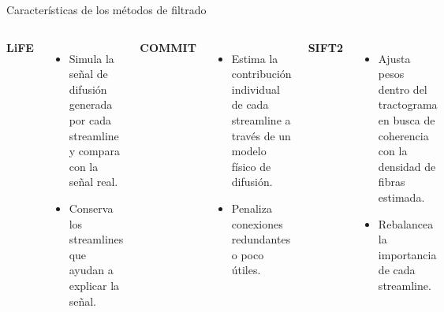 \documentclass[12pt, aspectratio=43]{beamer}
\begin{document}
\begin{frame}{Características de los métodos de filtrado}
\begin{center}
\begin{columns}[T]


\textbf{LiFE}

\vspace{0.2cm}

\begin{itemize}
    \item Simula la señal de difusión generada por cada streamline y compara con la señal real.
    \item Conserva los streamlines que ayudan a explicar la señal.
\end{itemize}


\textbf{COMMIT}

\vspace{0.2cm}

\begin{itemize}
    \item Estima la contribución individual de cada streamline a través de un modelo físico de difusión.
    \item Penaliza conexiones redundantes o poco útiles.
\end{itemize}


\textbf{SIFT2}

\vspace{0.2cm}

\begin{itemize}
    \item Ajusta pesos dentro del tractograma en busca de coherencia con la densidad de fibras estimada.
    \item Rebalancea la importancia de cada streamline.
\end{itemize}

\end{columns}    
\end{center}
\end{frame}




\end{document}
